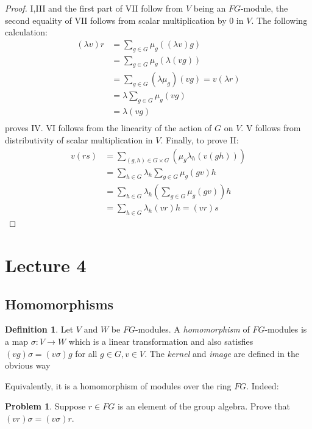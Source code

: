\documentclass[11pt, notitlepage]{article}
\numberwithin{equation}{section}
\theoremstyle{plain}
\theoremstyle{definition}
\newtheorem{definition}[theorem]{Definition}
\newtheorem{problem}{Problem}
\begin{document}
\begin{proof}
	I,III and the first part of VII follow from $V$ being an $FG$-module, the second equality of VII follows from scalar multiplication by 0 in $V$. The following calculation:
	\begin{align*}
	(\lambda v)r &= \sum_{g\in G}\mu_g((\lambda v)g)\\
	&=\sum_{g\in G}\mu_g(\lambda (vg))\\
	&=\sum_{g\in G}(\lambda \mu_g)(vg)=v(\lambda r)\\
	&=\lambda\sum_{g\in G}\mu_g (vg)\\
	&=\lambda(vg)\\
	\end{align*}proves IV. VI follows from the linearity of the action of $G$ on $V$. V follows from distributivity of scalar multiplication in $V$. Finally, to prove II:
	\begin{align*}
	v(rs)&=\sum_{(g,h)\in G\times G}(\mu_g\lambda_h(v(gh)))\\
	&= \sum_{h\in G}\lambda_h\sum_{g\in G}\mu_g(gv)h\\
	&= \sum_{h\in G}\lambda_h\left(\sum_{g\in G}\mu_g(gv)\right)h\\
	&=\sum_{h\in G}\lambda_h(vr)h=(vr)s
	\end{align*}
\end{proof}

















\section{Lecture 4}

\subsection{Homomorphisms} 

\begin{definition}
	Let $V$ and $W$ be $FG$-modules. A \textit{homomorphism} of $FG$-modules is a map $\sigma: V \rightarrow W$ which is a linear transformation and also satisfies $(vg)\sigma = (v\sigma)g$ for all $g\in G, v\in V$. The \textit{kernel} and \textit{image} are defined in the obvious way
\end{definition}
Equivalently, it is a homomorphism of modules over the ring $FG$. Indeed:
\begin{problem}
	Suppose $r\in FG$ is an element of the group algebra. Prove that $(vr)\sigma = (v\sigma)r$.
\end{problem}
\end{document}

